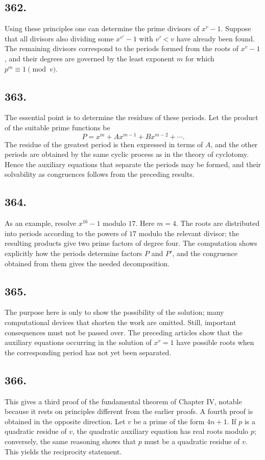 \documentclass[12pt]{article}
\begin{document}
\subsection*{362.}
Using these principles one can determine the prime divisors of $x^v-1$. Suppose that all divisors also dividing some $x^{v'}-1$ with $v'<v$ have already been found. The remaining divisors correspond to the periods formed from the roots of $x^v-1$, and their degrees are governed by the least exponent $m$ for which $p^m\equiv1\pmod v$.

\subsection*{363.}
The essential point is to determine the residues of these periods. Let the product of the suitable prime functions be
\[
P=x^m+Ax^{m-1}+Bx^{m-2}+\cdots .
\]
The residue of the greatest period is then expressed in terms of $A$, and the other periods are obtained by the same cyclic process as in the theory of cyclotomy. Hence the auxiliary equations that separate the periods may be formed, and their solvability as congruences follows from the preceding results.

\subsection*{364.}
As an example, resolve $x^{16}-1$ modulo $17$. Here $m=4$. The roots are distributed into periods according to the powers of $17$ modulo the relevant divisor; the resulting products give two prime factors of degree four. The computation shows explicitly how the periods determine factors $P$ and $P'$, and the congruence obtained from them gives the needed decomposition.

\subsection*{365.}
The purpose here is only to show the possibility of the solution; many computational devices that shorten the work are omitted. Still, important consequences must not be passed over. The preceding articles show that the auxiliary equations occurring in the solution of $x^v=1$ have possible roots when the corresponding period has not yet been separated.

\subsection*{366.}
This gives a third proof of the fundamental theorem of Chapter IV, notable because it rests on principles different from the earlier proofs. A fourth proof is obtained in the opposite direction. Let $v$ be a prime of the form $4n+1$. If $p$ is a quadratic residue of $v$, the quadratic auxiliary equation has real roots modulo $p$; conversely, the same reasoning shows that $p$ must be a quadratic residue of $v$. This yields the reciprocity statement.
\end{document}
